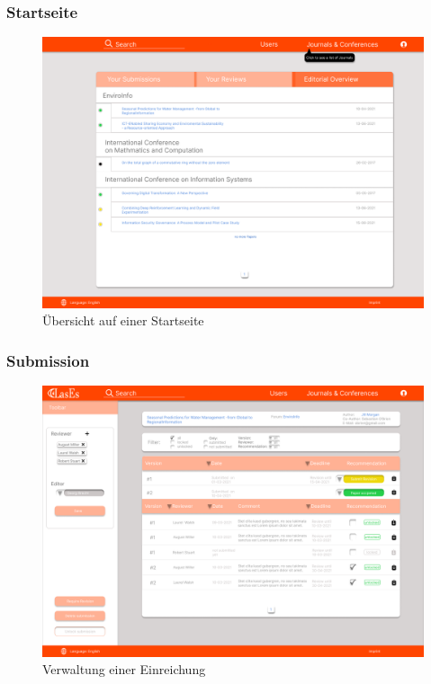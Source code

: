 \subsubsection{Startseite}

\begin{figure}[H]
	\centering
	\includegraphics[width=0.85\linewidth]{graphics/Homepage-png}
	\caption{Übersicht auf einer Startseite}
	\label{fig:homepageMockup}
\end{figure}

\subsubsection{Submission}

\begin{figure}[H]
	\centering
	\includegraphics[width=0.85\linewidth]{graphics/Submission-png}
	\caption{Verwaltung einer Einreichung}
	\label{fig:submission}
\end{figure}